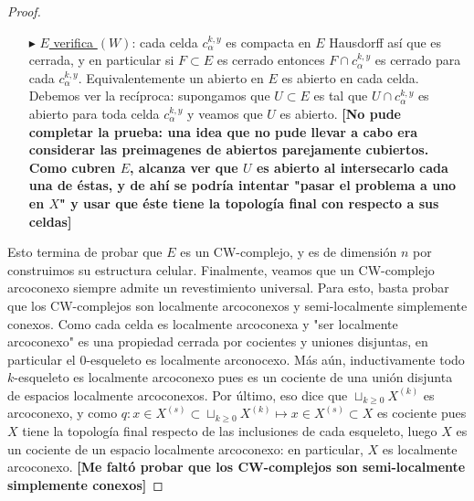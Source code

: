 \documentclass[11pt]{article}
\begin{document}
\begin{proof}
\begin{itemize}
y m\'as a\'un de aqu\'i se ve que si $c_\beta^{l,y}$ es cara de $c_\alpha^{k,x}$ entonces $e_\alpha^l$ es cara de  $e_\beta^k$. Entonces, si $c_\beta^{l,y}$ tuviese infinitas caras, tendr\'iamos al menos numerables celdas $\{c_{\alpha_n}^{k_n,y_n}\}_{n \geq 1}$ que son caras de $c_\beta^{l,y}$. Luego las celdas $\{e_{\alpha_n}^{k_n}\}_{n \geq 1}$ ser\'ian caras de $e_\beta^l$ y como $X$ es CW-complejo, deben ser finitas: as\'i, las suceciones $(\alpha_n)_n,(k_n)_n$ toman finitos valores $\gamma_1, \dots, \gamma_s$ y $m_1, \dots, m_r$. Luego, debe existir un par $(\gamma_i,k_j)$ tal que hay infinitas celdas de la forma $c_{\gamma_i}^{k_j,x}$ que son caras de $c_\beta^{l,y}$. \textbf{[Me falt\'o probar que esto \'ultimo es absurdo. Una idea que tuve, pero que no pude conretar, fue intentar ver que algunos de estos puntos formaban un subespacio discreto y usar la compacidad de $c_\alpha^{l,y}$]}
\item[$\blacktriangleright$] \underline{$E$ verifica $(W)$}: cada celda $c_\alpha^{k,y}$ es compacta en $E$ Hausdorff as\'i que es cerrada, y en particular si $F \subset E$ es cerrado entonces $F \cap c_\alpha^{k,y}$ es cerrado para cada $c_\alpha^{k,y}$. Equivalentemente un abierto en $E$ es abierto en cada celda. Debemos ver la rec\'iproca: supongamos que $U \subset E$ es tal que $U \cap c_\alpha^{k,y}$ es abierto para toda celda $c_\alpha^{k,y}$ y veamos que $U$ es abierto. \textbf{[No pude completar la prueba: una idea que no pude llevar a cabo era considerar las preimagenes de abiertos parejamente cubiertos. Como cubren $E$, alcanza ver que $U$ es abierto al intersecarlo cada una de \'estas, y de ah\'i se podr\'ia intentar "pasar el problema a uno en $X$" y usar que \'este tiene la topolog\'ia final con respecto a sus celdas]}
\end{itemize}
Esto termina de probar que $E$ es un CW-complejo, y es de dimensi\'on $n$ por construimos su estructura celular. Finalmente, veamos que un CW-complejo arcoconexo siempre admite un revestimiento universal. Para esto, basta probar que los CW-complejos son localmente arcoconexos y semi-localmente simplemente conexos. Como cada celda es localmente arcoconexa y "ser localmente arcoconexo" es una propiedad cerrada por cocientes y uniones disjuntas, en particular el $0$-esqueleto es localmente arconocexo. M\'as a\'un, inductivamente todo $k$-esqueleto es localmente arcoconexo pues es un cociente de una uni\'on disjunta de espacios localmente arcoconexos. Por \'ultimo, eso dice que $\sqcup_{k \geq 0}X^{(k)}$ es arcoconexo, y como $q : x \in X^{(s)} \subset \sqcup_{k \geq 0}X^{(k)} \mapsto x \in X^{(s)} \subset X$ es cociente pues $X$ tiene la topolog\'ia final respecto de las inclusiones de cada esqueleto, luego $X$ es un cociente de un espacio localmente arcoconexo: en particular, $X$ es localmente arcoconexo. \textbf{[Me falt\'o probar que los CW-complejos son semi-localmente simplemente conexos]}
\end{proof}
\end{document}
